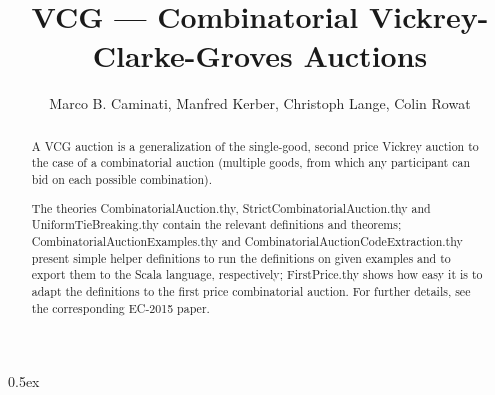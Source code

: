 \documentclass[11pt,a4paper]{article}
\begin{document}
\title{VCG --- Combinatorial Vickrey-Clarke-Groves Auctions}
\author{Marco B. Caminati, Manfred Kerber, Christoph Lange, Colin Rowat}

\maketitle

\begin{abstract}
    A VCG auction is a generalization of the single-good, second price
    Vickrey auction to the case of a combinatorial auction (multiple
    goods, from which any participant can bid on each possible
    combination).

    The theories CombinatorialAuction.thy, StrictCombinatorialAuction.thy
    and UniformTieBreaking.thy contain the relevant definitions and
    theorems; CombinatorialAuctionExamples.thy and
    CombinatorialAuctionCodeExtraction.thy present simple helper
    definitions to run the definitions on given examples and to export
    them to the Scala language, respectively; FirstPrice.thy shows how
    easy it is to adapt the definitions to the first price combinatorial
    auction. For further details, see the corresponding EC-2015 paper.
\end{abstract}

\tableofcontents

\parindent 0pt\parskip 0.5ex



%
%
\end{document}
